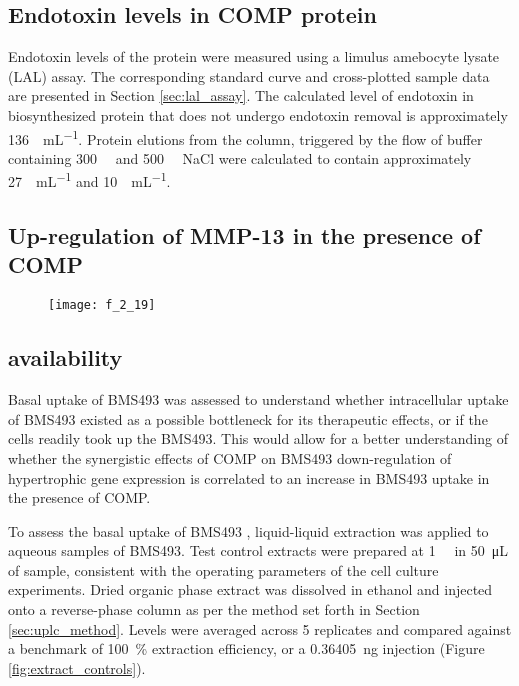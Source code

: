 \begin{refsection}
\subsection{Endotoxin levels in COMP protein}

Endotoxin levels of the protein were measured using a limulus amebocyte lysate
(LAL) assay. The corresponding standard curve and cross-plotted sample data are
presented in Section \ref{sec:lal_assay}. The calculated level of endotoxin in
biosynthesized protein that does not undergo endotoxin removal is approximately
\SI{136}{\EU\per\mL}. Protein elutions from the column, triggered by the flow of
buffer containing \SI{300}{\milli\moLar} and \SI{500}{\milli\moLar} NaCl were
calculated to contain approximately \SI{27}{\EU\per\mL} and \SI{10}{\EU\per\mL}.

\subsection{Up-regulation of MMP-13 in the presence of COMP}

\begin{figure}[h!] \centering \texttt{[image: f\_2\_19]}
    \caption[]{\cite{}}\label{fig:mmp13} \end{figure}

\subsection{ availability}

Basal uptake of BMS493 was assessed to understand whether
intracellular uptake of BMS493 existed as a possible bottleneck for its
therapeutic effects, or if the cells readily took up the BMS493. This would
allow for a better understanding of whether the synergistic effects of COMP on
BMS493 down-regulation of hypertrophic gene expression is correlated to an
increase in BMS493 uptake in the presence of COMP.

To assess the basal uptake of BMS493 , liquid-liquid
extraction was applied to aqueous samples of BMS493. Test control extracts were
prepared at \SI{1}{\micro\moLar} in \SI{50}{\uL} of sample, consistent with the
operating parameters of the  cell culture experiments. Dried
organic phase extract was dissolved in ethanol and injected onto a reverse-phase
column as per the method set forth in Section \ref{sec:uplc_method}. Levels were
averaged across 5 replicates and compared against a benchmark of
\SI{100}{\percent} extraction efficiency, or a \SI{0.36405}{\ng} injection
(Figure \ref{fig:extract_controls}).


\end{refsection}

